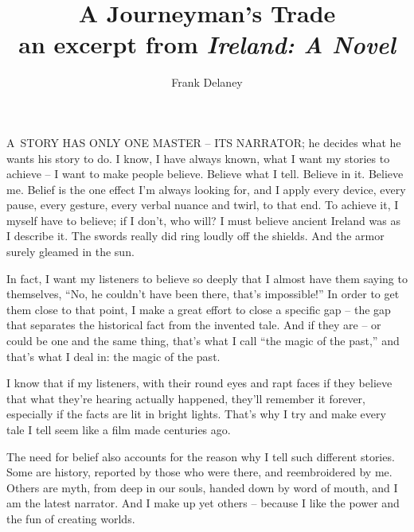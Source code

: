 \documentclass[openany]{memoir}
\begin{document}
\title{A Journeyman's Trade\\
\vspace{0.5em} \large an excerpt from \textit{Ireland: A Novel}}
\author{Frank Delaney}
\date{}%
\maketitle



\lettrine[lines=3]{A} \ STORY HAS ONLY ONE MASTER -- ITS NARR\-ATOR; he decides what he wants his story to do.
I know, I have always known, what I want my stories to achieve -- I want to make people believe.
Believe what I tell.
Believe in it.
Believe me.
Belief is the one effect I'm always looking for, and I apply every device, every pause, every gesture, every verbal nuance and twirl, to that end.
To achieve it, I myself have to believe; if I don't, who will? I must believe ancient Ireland was as I describe it.
The swords really did ring loudly off the shields.
And the armor surely gleamed in the sun.

In fact, I want my listeners to believe so deeply that I almost have them saying to themselves, ``No, he couldn't have been there, that's impossible!'' In order to get them close to that point, I make a great effort to close a specific gap -- the gap that separates the historical fact from the invented tale.
And if they are -- or could be one and the same thing, that's what I call ``the magic of the past,'' and that's what I deal in: the magic of the past.

I know that if my listeners, with their round eyes and rapt faces if they believe that what they're hearing actually happened, they'll remember it forever, especially if the facts are lit in bright lights.
That's why I try and make every tale I tell seem like a film made centuries ago.

The need for belief also accounts for the reason why I tell such different stories.
Some are history, reported by those who were there, and reembroidered by me.
Others are myth, from deep in our souls, handed down by word of mouth, and I am the latest narrator.
And I make up yet others -- because I like the power and the fun of creating worlds.
\end{document}
